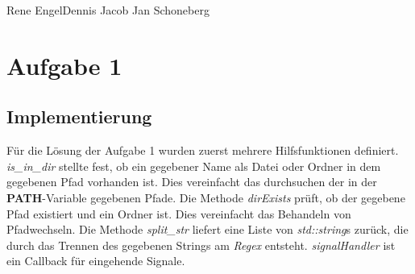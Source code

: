 \documentclass{ti2}
\begin{document}
%
                {Rene Engel}{Dennis Jacob}%
                {Jan Schoneberg}%
                


\section*{Aufgabe 1}
\subsection*{Implementierung}

Für die Lösung der Aufgabe 1 wurden zuerst mehrere Hilfsfunktionen definiert. \textit{is\_in\_dir} stellte fest, ob ein gegebener Name als Datei oder Ordner in dem gegebenen Pfad vorhanden ist. Dies vereinfacht das durchsuchen der in der \textbf{PATH}-Variable gegebenen Pfade. Die Methode \textit{dirExists} prüft, ob der gegebene Pfad existiert und ein Ordner ist. Dies vereinfacht das Behandeln von Pfadwechseln. Die Methode \textit{split\_str} liefert eine Liste von \textit{std::string}s zurück, die durch das Trennen des gegebenen Strings am \textit{Regex} entsteht. \textit{signalHandler} ist ein Callback für eingehende Signale.
\end{document}
